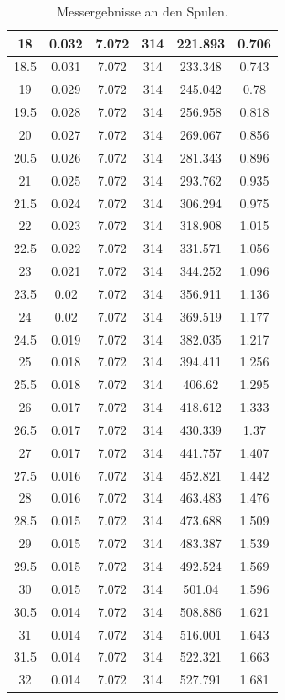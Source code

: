 \documentclass[10pt,a4paper]{article}
\begin{document}
\begin{flushleft}
\begin{itemize}
\begin{table}[H]
{\begin{subtable}[t]{.6\textwidth}
\begin{tabular}{|c|c|c|c|c|c|}
\hline
18 & 0.032 & 7.072 & 314 & 221.893 & 0.706 \\ 
\hline
18.5 & 0.031 & 7.072 & 314 & 233.348 & 0.743 \\ 
\hline
19 & 0.029 & 7.072 & 314 & 245.042 & 0.78 \\ 
\hline
19.5 & 0.028 & 7.072 & 314 & 256.958 & 0.818 \\ 
\hline
20 & 0.027 & 7.072 & 314 & 269.067 & 0.856 \\ 
\hline
20.5 & 0.026 & 7.072 & 314 & 281.343 & 0.896 \\ 
\hline
21 & 0.025 & 7.072 & 314 & 293.762 & 0.935 \\ 
\hline
21.5 & 0.024 & 7.072 & 314 & 306.294 & 0.975 \\ 
\hline
22 & 0.023 & 7.072 & 314 & 318.908 & 1.015 \\ 
\hline
22.5 & 0.022 & 7.072 & 314 & 331.571 & 1.056 \\ 
\hline
23 & 0.021 & 7.072 & 314 & 344.252 & 1.096 \\ 
\hline
23.5 & 0.02 & 7.072 & 314 & 356.911 & 1.136 \\ 
\hline
24 & 0.02 & 7.072 & 314 & 369.519 & 1.177 \\ 
\hline
24.5 & 0.019 & 7.072 & 314 & 382.035 & 1.217 \\ 
\hline
25 & 0.018 & 7.072 & 314 & 394.411 & 1.256 \\ 
\hline
25.5 & 0.018 & 7.072 & 314 & 406.62 & 1.295 \\ 
\hline
26 & 0.017 & 7.072 & 314 & 418.612 & 1.333 \\ 
\hline
26.5 & 0.017 & 7.072 & 314 & 430.339 & 1.37 \\ 
\hline
27 & 0.017 & 7.072 & 314 & 441.757 & 1.407 \\ 
\hline
27.5 & 0.016 & 7.072 & 314 & 452.821 & 1.442 \\ 
\hline
28 & 0.016 & 7.072 & 314 & 463.483 & 1.476 \\ 
\hline
28.5 & 0.015 & 7.072 & 314 & 473.688 & 1.509 \\ 
\hline
29 & 0.015 & 7.072 & 314 & 483.387 & 1.539 \\ 
\hline
29.5 & 0.015 & 7.072 & 314 & 492.524 & 1.569 \\ 
\hline
30 & 0.015 & 7.072 & 314 & 501.04 & 1.596 \\ 
\hline
30.5 & 0.014 & 7.072 & 314 & 508.886 & 1.621 \\ 
\hline
31 & 0.014 & 7.072 & 314 & 516.001 & 1.643 \\ 
\hline
31.5 & 0.014 & 7.072 & 314 & 522.321 & 1.663 \\ 
\hline
32 & 0.014 & 7.072 & 314 & 527.791 & 1.681 \\ 
\hline
\end{tabular}
\normalsize
\label{tab:messerg_spul2}
\end{subtable}
}
\caption{Messergebnisse an den Spulen.}
\label{tab_messerg_spulen}
\end{table}


\end{itemize}
\end{flushleft}
\end{document}
